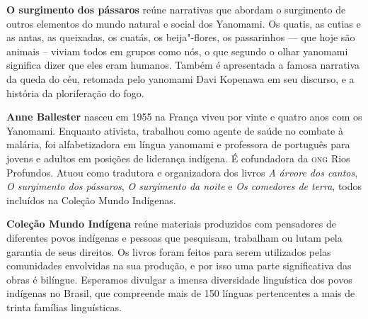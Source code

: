 \textbf{O surgimento dos pássaros} \lipsum[1] reúne narrativas que abordam o surgimento de outros elementos
do mundo natural e social dos Yanomami. Os quatis, as cutias e as antas, as queixadas, os cuatás, os beija"-flores, os passarinhos --- que hoje são animais -- viviam todos em grupos como nós, o que segundo o olhar yanomami significa dizer que eles eram humanos. Também é apresentada a famosa narrativa da queda do céu, retomada pelo yanomami Davi Kopenawa em seu discurso, e a história da ploriferação do fogo. 

\textbf{Anne Ballester} nasceu em 1955 na França viveu por vinte e quatro anos com os Yanomami. 
Enquanto ativista, trabalhou como agente de saúde no combate à malária, foi alfabetizadora em língua 
yanomami e professora de português para jovens e adultos em posições de liderança indígena. É cofundadora da \textsc{ong} Rios Profundos. Atuou como tradutora e organizadora dos livros \textit{A árvore dos cantos}, \textit{O surgimento dos pássaros}, \textit{O surgimento da noite} e \textit{Os comedores de terra}, todos incluídos na Coleção Mundo Indígenas.


\textbf{Coleção Mundo Indígena} reúne materiais produzidos com pensadores de diferentes povos indígenas e pessoas que pesquisam, trabalham ou lutam pela garantia de seus direitos. Os livros foram feitos para serem utilizados pelas comunidades envolvidas na sua produção, e por isso uma parte significativa das obras é bilíngue. Esperamos divulgar a imensa diversidade linguística dos povos indígenas no Brasil, que compreende mais de 150 línguas pertencentes a mais de trinta famílias linguísticas.



